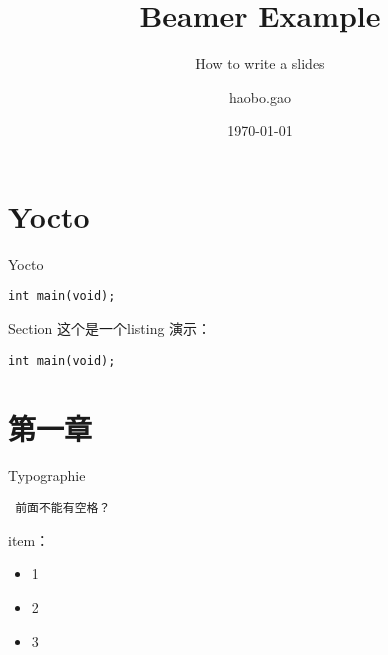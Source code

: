 \documentclass[10pt]{beamer}
\title{Beamer Example}
\subtitle{How to write a slides}
\date{\today}
\author{haobo.gao}
\institute{ZhengZhou}
\begin{document}
\begin{frame}
	\titlepage
\end{frame}



\section{Yocto}

\begin{frame}[fragile]{Yocto}





  
	\begin{verbatim}
int main(void);
	\end{verbatim}
\end{frame}

\begin{frame}[fragile]{Section}
这个是一个listing 演示：
\begin{lstlisting}
int main(void);
\end{lstlisting}
\end{frame}

\section{第一章}

\begin{frame}[fragile]{Typographie}
\begin{lstlisting}
 前面不能有空格？
\end{lstlisting}

item：
\begin{itemize}
\item 1
\item 2
\item 3
\end{itemize}

\end{frame}
\end{document}
